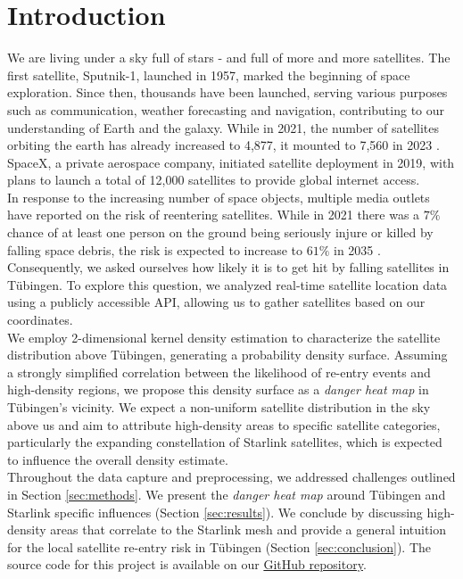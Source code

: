 \documentclass{article}
\theoremstyle{plain}
\theoremstyle{definition}
\theoremstyle{remark}
\begin{document}
\section{Introduction}\label{sec:intro}
We are living under a sky full of stars - and full of more and more satellites. The first satellite, Sputnik-1, launched in 1957, marked the beginning of space exploration. Since then, thousands have been launched, serving various purposes such as communication, weather forecasting and navigation, contributing to our understanding of Earth and the galaxy. While in 2021, the number of satellites orbiting the earth has already increased to 4,877, it mounted to 7,560 in 2023 \cite{ucs_database}. 
SpaceX, a private aerospace company, initiated satellite deployment in 2019, with plans to launch a total of 12,000 satellites to provide global internet access.\\ 
In response to the increasing number of space objects, multiple media outlets have reported on the risk of reentering satellites. While in 2021 there was a $7\%$ chance of at least one person on the ground being seriously injure or killed by falling space debris, the risk is expected to increase to $61\%$ in 2035 \cite{FAA_report}. 
Consequently, we asked ourselves how likely it is to get hit by falling satellites in Tübingen. To explore this question, we analyzed real-time satellite location data using a publicly accessible API, allowing us to gather satellites based on our coordinates.\\
We employ 2-dimensional kernel density estimation to characterize the satellite distribution above Tübingen, generating a probability density surface. Assuming a strongly simplified correlation between the likelihood of re-entry events and high-density regions, we propose this density surface as a \textit{danger heat map} in Tübingen's vicinity. We expect a non-uniform satellite distribution in the sky above us and aim to attribute high-density areas to specific satellite categories, particularly the expanding constellation of Starlink satellites, which is expected to influence the overall density estimate.\\
Throughout the data capture and preprocessing, we addressed challenges outlined in Section \ref{sec:methods}. We present the \textit{danger heat map} around Tübingen and Starlink specific influences (Section \ref{sec:results}). We conclude by discussing high-density areas that correlate to the Starlink mesh and provide a general intuition for the local satellite re-entry risk in Tübingen (Section \ref{sec:conclusion}).
The source code for this project is available on our \href{https://github.com/timoluebbing/Satellites}{GitHub repository}.
\end{document}
